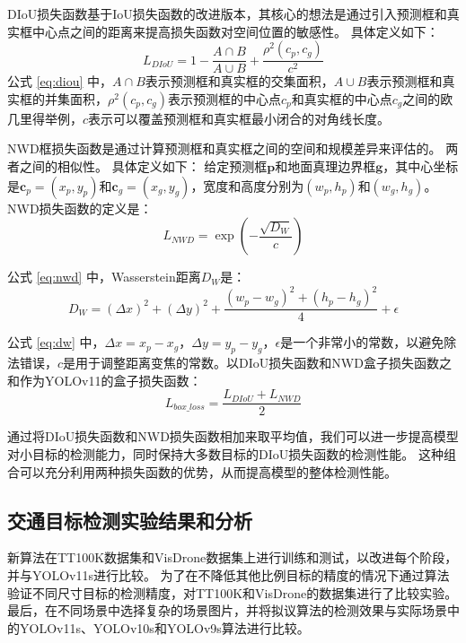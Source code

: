 DIoU损失函数基于IoU损失函数的改进版本，其核心的想法是通过引入预测框和真实框中心点之间的距离来提高损失函数对空间位置的敏感性。
具体定义如下：
\begin{equation}
    \label{eq:diou}
    L_{DIoU} = 1 - \frac{A\cap{B}}{A\cup{B}} + \frac{\rho^2(c_p, c_g)}{c^2}
\end{equation}
公式 \ref{eq:diou} 中，$A\cap{B}$表示预测框和真实框的交集面积，$A\cup{B}$表示预测框和真实框的并集面积，$\rho^2(c_p, c_g)$表示预测框的中心点$c_p$和真实框的中心点$c_g$之间的欧几里得举例，$c$表示可以覆盖预测框和真实框最小闭合的对角线长度。

NWD框损失函数是通过计算预测框和真实框之间的空间和规模差异来评估的。 两者之间的相似性。
具体定义如下：
给定预测框$\mathbf{p}$和地面真理边界框$\mathbf{g}$，其中心坐标是$\mathbf{c}_p = (x_p, y_p)$和$\mathbf{c}_g = (x_g, y_g)$，宽度和高度分别为$(w_p, h_p)$和$(w_g, h_g)$。 NWD损失函数的定义是：
\begin{equation}
    L_{NWD} = \exp\left(-\frac{\sqrt{D_W}}{c}\right)
    \label{eq:nwd}
\end{equation}

公式 \eqref{eq:nwd} 中，Wasserstein距离$D_W$是：
\begin{equation}
    D_W = (\Delta x)^2 + (\Delta y)^2 + \frac{(w_p - w_g)^2 + (h_p - h_g)^2}{4} + \epsilon
    \label{eq:dw}
\end{equation}

公式 \eqref{eq:dw} 中，$\Delta x = x_p - x_g$，$\Delta y = y_p - y_g$，$\epsilon$是一个非常小的常数，以避免除法错误，$c$是用于调整距离变焦的常数。以DIoU损失函数和NWD盒子损失函数之和作为YOLOv11的盒子损失函数：
\begin{equation}
    L_{box\_loss} = \frac{L_{DIoU}+L_{NWD}}{2}
\end{equation}

通过将DIoU损失函数和NWD损失函数相加来取平均值，我们可以进一步提高模型对小目标的检测能力，同时保持大多数目标的DIoU损失函数的检测性能。
这种组合可以充分利用两种损失函数的优势，从而提高模型的整体检测性能。


\subsection{交通目标检测实验结果和分析}

新算法在TT100K数据集\cite{tt100k}和VisDrone数据集\cite{vd}上进行训练和测试，以改进每个阶段，并与YOLOv11s\cite{yolov11}进行比较。
为了在不降低其他比例目标的精度的情况下通过算法验证不同尺寸目标的检测精度，对TT100K和VisDrone的数据集进行了比较实验。
最后，在不同场景中选择复杂的场景图片，并将拟议算法的检测效果与实际场景中的YOLOv11s、YOLOv10s\cite{yolov10}和YOLOv9s\cite{yolov9}算法进行比较。

